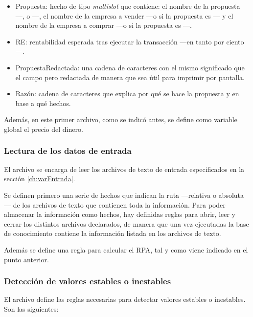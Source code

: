 \documentclass[a4paper, 11pt, titlepage]{article}
\begin{document}
    \begin{itemize}
        \item Propuesta: hecho de tipo \emph{multislot} que contiene: el nombre de la propuesta ---,  o ---, el nombre de la empresa a vender ---o  si la propuesta es --- y el nombre de la empresa a comprar ---o  si la propuesta es ---.
        \item RE: rentabilidad esperada tras ejecutar la transacción ---en tanto por ciento---.
        \item PropuestaRedactada: una cadena de caracteres con el mismo significado que el campo  pero redactada de manera que sea útil para imprimir por pantalla.
        \item Razón: cadena de caracteres que explica por qué se hace la propuesta y en base a qué hechos.
    \end{itemize}

    Además, en este primer archivo, como se indicó antes, se define como variable global el precio del dinero.

    \subsubsection*{Lectura de los datos de entrada}

    El archivo  se encarga de leer los archivos de texto de entrada especificados en la sección \ref{ch:varEntrada}.

    Se definen primero una serie de hechos que indican la ruta ---relativa o absoluta--- de los archivos de texto que contienen toda la información. Para poder almacenar la información como hechos, hay definidas reglas para abrir, leer y cerrar los distintos archivos declarados, de manera que una vez ejecutadas la base de conocimiento contiene la información listada en los archivos de texto.

    Además se define una regla para calcular el RPA, tal y como viene indicado en el punto anterior.

    \subsubsection*{Detección de valores estables o inestables}

    El archivo  define las reglas necesarias para detectar valores estables o inestables. Son las siguientes:
\end{document}
